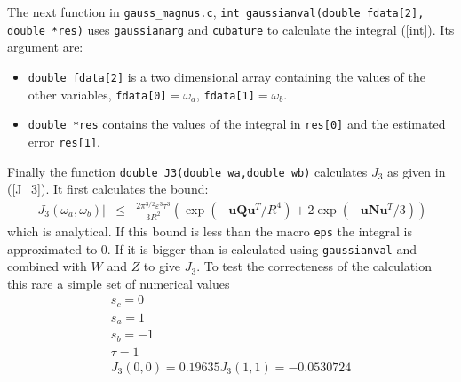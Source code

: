 \documentclass[10pt,letterpaper]{article}
\begin{document}
The next function in \verb|gauss_magnus.c|, \verb|int gaussianval(double fdata[2], double *res)| uses \verb|gaussianarg| and \verb|cubature| to calculate the integral (\ref{int}). Its argument are:
\begin{itemize}
\item \verb|double fdata[2]| is a two dimensional array containing the values of the other variables, \verb|fdata[0]|$=\omega_a$, \verb|fdata[1]|$=\omega_b$.
\item \verb|double *res| contains the values of the integral in \verb|res[0]| and the estimated error \verb|res[1]|.
\end{itemize}
Finally the function \verb|double J3(double wa,double wb)| calculates $J_3$ as given in (\ref{J_3}). It first calculates the bound:
\begin{eqnarray}
|J_3(\omega_a,\omega_b)| &\leq& \frac{2\pi^{3/2} \varepsilon^3 \tau^3}{3 R^2} \left( \exp\left(-\mathbf{u}\mathbf{Q}\mathbf{u}^T/R^4 \right)+2 \exp\left(-\mathbf{u} \mathbf{N} \mathbf{u}^T/3\right)\right)
\end{eqnarray}
which is analytical. If this bound is less than the macro \verb|eps| the integral is approximated to 0. If it is bigger than is calculated using \verb|gaussianval| and combined with $W$ and $Z$ to give $J_3$. To test the correcteness of the calculation this rare a simple set of numerical values
\begin{eqnarray}
s_c=0\\
s_a=1\\
s_b=-1\\
\tau=1\\
J_3(0,0)=0.19635
J_3(1,1)=-0.0530724
\end{eqnarray}
\end{document}
